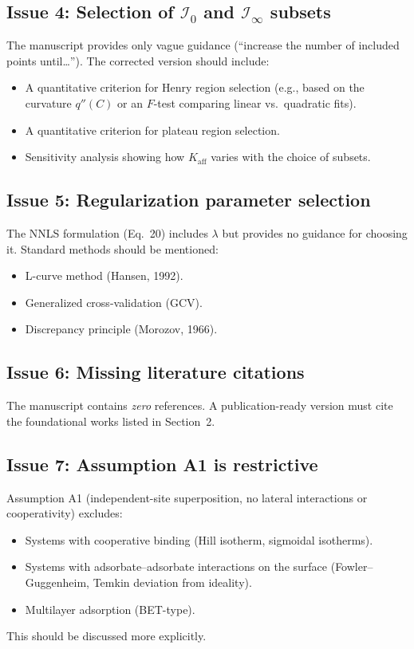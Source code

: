 \documentclass[12pt]{article}
\begin{document}
\subsection{Issue 4: Selection of $\mathcal{I}_0$ and $\mathcal{I}_\infty$ subsets}

The manuscript provides only vague guidance (``increase the number of
included points until\ldots'').  The corrected version should include:
\begin{itemize}[nosep]
  \item A quantitative criterion for Henry region selection (e.g., based
        on the curvature $q''(C)$ or an $F$-test comparing linear vs.\
        quadratic fits).
  \item A quantitative criterion for plateau region selection.
  \item Sensitivity analysis showing how $K_{\mathrm{aff}}$ varies with
        the choice of subsets.
\end{itemize}

\subsection{Issue 5: Regularization parameter selection}

The NNLS formulation (Eq.~20) includes $\lambda$ but provides no
guidance for choosing it.  Standard methods should be mentioned:
\begin{itemize}[nosep]
  \item L-curve method (Hansen, 1992).
  \item Generalized cross-validation (GCV).
  \item Discrepancy principle (Morozov, 1966).
\end{itemize}

\subsection{Issue 6: Missing literature citations}

The manuscript contains \emph{zero} references.  A publication-ready
version must cite the foundational works listed in Section~2.

\subsection{Issue 7: Assumption A1 is restrictive}

Assumption A1 (independent-site superposition, no lateral interactions or
cooperativity) excludes:
\begin{itemize}[nosep]
  \item Systems with cooperative binding (Hill isotherm, sigmoidal
        isotherms).
  \item Systems with adsorbate--adsorbate interactions on the surface
        (Fowler--Guggenheim, Temkin deviation from ideality).
  \item Multilayer adsorption (BET-type).
\end{itemize}
This should be discussed more explicitly.
\end{document}

